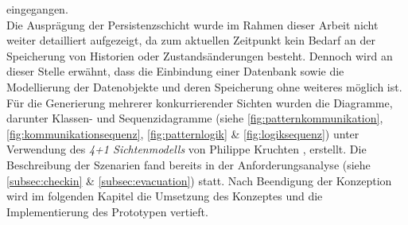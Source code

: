     eingegangen. 
    \\
    Die Ausprägung der Persistenzschicht wurde im Rahmen dieser Arbeit nicht weiter detailliert aufgezeigt, da zum aktuellen Zeitpunkt 
    kein Bedarf an der Speicherung von Historien oder Zustandsänderungen besteht. Dennoch wird an dieser Stelle erwähnt, dass die Einbindung einer 
    Datenbank sowie die Modellierung der Datenobjekte und deren Speicherung ohne weiteres möglich ist. 
\\
\linebreak
Für die Generierung mehrerer konkurrierender Sichten wurden die Diagramme, darunter Klassen- und Sequenzidagramme 
(siehe \ref{fig:patternkommunikation}, \ref{fig:kommunikationsequenz}, \ref{fig:patternlogik} \& \ref{fig:logiksequenz}) 
unter Verwendung des \textit{4+1 Sichtenmodells} von Philippe Kruchten \cite{Kruchten1995}, erstellt. 
Die Beschreibung der Szenarien fand bereits in der Anforderungsanalyse (siehe \ref{subsec:checkin} \& \ref{subsec:evacuation}) statt. 
Nach Beendigung der Konzeption wird im folgenden Kapitel die Umsetzung des Konzeptes und die 
Implementierung des Prototypen vertieft. 
